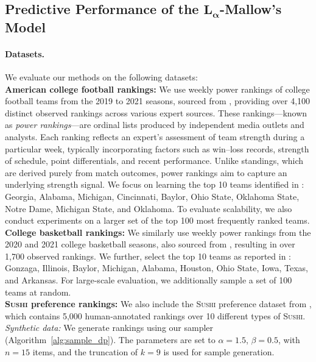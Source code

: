 \documentclass{article}
\begin{document}
\subsection{Predictive Performance of the {$\boldsymbol{L}_{\boldsymbol{\alpha}}$-}Mallow's Model}\label{sec:experimetins_MLE}




\paragraph{Datasets.} We evaluate our methods on the following datasets:
\\ \textbf{American college football rankings:}  
    We use weekly power rankings of college football teams from the 2019 to 2021 seasons, sourced from \cite{masseyratings_rankings}, providing over 4,100 distinct observed rankings across various expert sources.  These rankings—known as \emph{power rankings}—are ordinal lists produced by independent media outlets and analysts. Each ranking reflects an expert's assessment of team strength during a particular week, typically incorporating factors such as win–loss records, strength of schedule, point differentials, and recent performance. Unlike standings, which are derived purely from match outcomes, power rankings aim to capture an underlying strength signal.
    We focus on learning the top 10 teams identified in \cite{bleacherreport2022apcfp}: Georgia, Alabama, Michigan, Cincinnati, Baylor, Ohio State, Oklahoma State, Notre Dame, Michigan State, and Oklahoma. To evaluate scalability, we also conduct experiments on a larger set of the top 100 most frequently ranked teams.
    \\ \textbf{College basketball rankings:}  
  We similarly use weekly power rankings from the 2020 and 2021 college basketball seasons, also sourced from \cite{masseyratings_rankings}, resulting in over 1,700 observed rankings. 
    We further, select the top 10 teams as reported in \cite{collegepollarchive2021ap}: Gonzaga, Illinois, Baylor, Michigan, Alabama, Houston, Ohio State, Iowa, Texas, and Arkansas. For large-scale evaluation, we additionally sample a set of 100 teams at random.
    \\ \textbf{\textsc{Sushi} preference rankings:}  
    We also include the \textsc{Sushi} preference dataset from \cite{sushi2005dataset}, which contains 5,000 human-annotated rankings over 10 different types of \textsc{Sushi}.\\\textit{Synthetic data:} We generate rankings using our sampler (Algorithm~\ref{alg:sample_dp}). The parameters are set to $\alpha = 1.5$, $\beta = 0.5$, with $n = 15$ items, and the truncation of  $k = 9$ is used for sample generation. 
\end{document}
